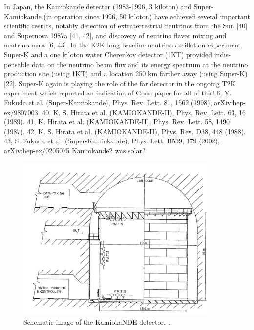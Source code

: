  In Japan, the Kamiokande detector (1983-1996, 3 kiloton) and Super-Kamiokande (in operation since 1996, 50 kiloton) have achieved several important scientific results, notably detection of extraterrestrial neutrinos from the Sun [40] and Supernova 1987a [41, 42], and discovery of neutrino flavor mixing and neutrino mass [6, 43]. In the K2K long baseline neutrino oscillation experiment, Super-K and a one kiloton water Cherenkov detector (1KT) provided indis- pensable data on the neutrino beam flux and its energy spectrum at the neutrino production site (using 1KT) and a location 250 km farther away (using Super-K) [22]. Super-K again is playing the role of the far detector in the ongoing T2K experiment which reported an indication of %
Good paper for all of this! %
6, Y. Fukuda et al. (Super-Kamiokande), Phys. Rev. Lett. 81, 1562 (1998), arXiv:hep-ex/9807003.
40, K. S. Hirata et al. (KAMIOKANDE-II), Phys. Rev. Lett. 63, 16 (1989).
41, K. Hirata et al. (KAMIOKANDE-II), Phys. Rev. Lett. 58, 1490 (1987).
42, K. S. Hirata et al. (KAMIOKANDE-II), Phys. Rev. D38, 448 (1988).
43, S. Fukuda et al. (Super-Kamiokande), Phys. Lett. B539, 179 (2002), arXiv:hep-ex/0205075
Kamiokande2 was solar?
\fi
\begin{figure}[h!]
\centering
  \centering
\includegraphics[width=0.9\textwidth]{figures/Kamioka1.jpeg}
\vspace{2mm}
\caption{Schematic image of the KamiokaNDE detector.~\cite{58KAMIOKA}.}
\label{fig:Kam}
\end{figure}

